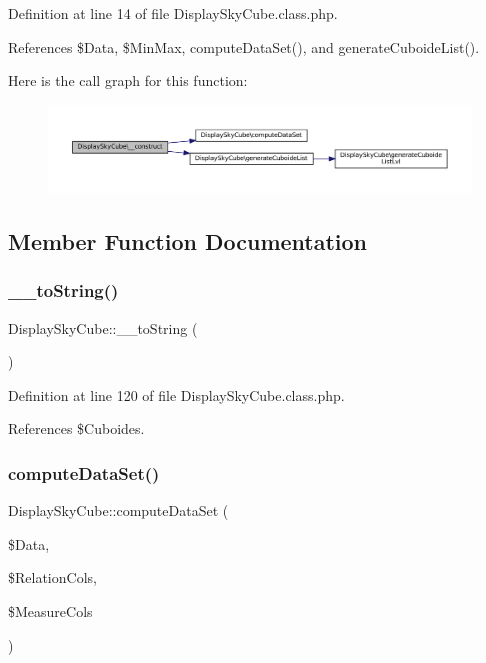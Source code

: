 Definition at line 14 of file Display\+Sky\+Cube.\+class.\+php.



References \$\+Data, \$\+Min\+Max, compute\+Data\+Set(), and generate\+Cuboide\+List().

Here is the call graph for this function\+:\nopagebreak
\begin{figure}[H]
\begin{center}
\leavevmode
\includegraphics[width=350pt]{class_display_sky_cube_af33927a125f0e2b5a2eb7aea75b68b6b_cgraph}
\end{center}
\end{figure}


\subsection{Member Function Documentation}
\mbox{\label{class_display_sky_cube_a9e27a7080cb4ac530921ce0c0ff31964}} 
\subsubsection{\texorpdfstring{\+\_\+\+\_\+to\+String()}{\_\_toString()}}
{\footnotesize\ttfamily Display\+Sky\+Cube\+::\+\_\+\+\_\+to\+String (\begin{DoxyParamCaption}{ }\end{DoxyParamCaption})}



Definition at line 120 of file Display\+Sky\+Cube.\+class.\+php.



References \$\+Cuboides.

\mbox{\label{class_display_sky_cube_a0a64068061d9a2e499bb5cf58ebf51ce}} 
\subsubsection{\texorpdfstring{compute\+Data\+Set()}{computeDataSet()}}
{\footnotesize\ttfamily Display\+Sky\+Cube\+::compute\+Data\+Set (\begin{DoxyParamCaption}\item[{}]{\$\+Data,  }\item[{}]{\$\+Relation\+Cols,  }\item[{}]{\$\+Measure\+Cols }\end{DoxyParamCaption})\hspace{0.3cm}{\ttfamily [protected]}}



